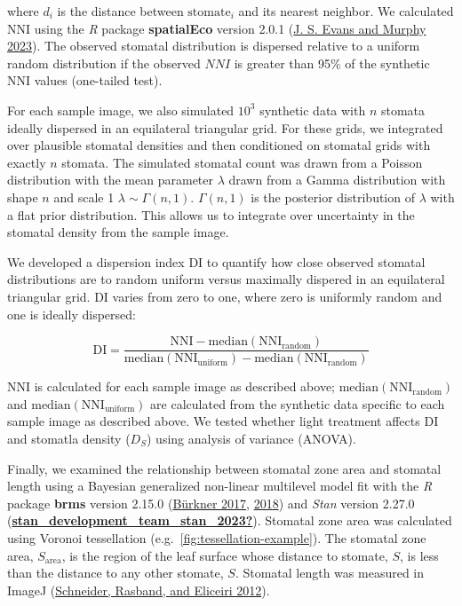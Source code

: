 \documentclass[12pt,halfline,a4paper,]{ouparticle}
\begin{document}
\noindent where \(d_i\) is the distance between \(\text{stomate}_i\) and
its nearest neighbor. We calculated \(\mathrm{NNI}\) using the \emph{R}
package \textbf{spatialEco} version 2.0.1
(\protect\hyperlink{ref-evans_spatialeco_2023}{J. S. Evans and Murphy
2023}). The observed stomatal distribution is dispersed relative to a
uniform random distribution if the observed \(NNI\) is greater than 95\%
of the synthetic \(\mathrm{NNI}\) values (one-tailed test).

For each sample image, we also simulated \(10^3\) synthetic data with
\(n\) stomata ideally dispersed in an equilateral triangular grid. For
these grids, we integrated over plausible stomatal densities and then
conditioned on stomatal grids with exactly \(n\) stomata. The simulated
stomatal count was drawn from a Poisson distribution with the mean
parameter \(\lambda\) drawn from a Gamma distribution with shape \(n\)
and scale 1 \(\lambda \sim \Gamma(n, 1)\). \(\Gamma(n, 1)\) is the
posterior distribution of \(\lambda\) with a flat prior distribution.
This allows us to integrate over uncertainty in the stomatal density
from the sample image.

We developed a dispersion index \(\mathrm{DI}\) to quantify how close
observed stomatal distributions are to random uniform versus maximally
dispered in an equilateral triangular grid. \(\mathrm{DI}\) varies from
zero to one, where zero is uniformly random and one is ideally
dispersed:

\begin{equation}\label{eq:disp}
  \mathrm{DI} = \frac{\mathrm{NNI} - \text{median}(\mathrm{NNI_{random}})}{\text{median}(\mathrm{NNI_{uniform}}) - \text{median}(\mathrm{NNI_{random}})}
\end{equation}

\noindent \(\mathrm{NNI}\) is calculated for each sample image as
described above; \(\text{median}(\mathrm{NNI_{random}})\) and
\(\text{median}(\mathrm{NNI_{uniform}})\) are calculated from the
synthetic data specific to each sample image as described above. We
tested whether light treatment affects \(\mathrm{DI}\) and stomatla
density (\(D_S\)) using analysis of variance (ANOVA).

Finally, we examined the relationship between stomatal zone area and
stomatal length using a Bayesian generalized non-linear multilevel model
fit with the \emph{R} package \textbf{brms} version 2.15.0
(\protect\hyperlink{ref-burkner_brms_2017}{Bürkner 2017},
\protect\hyperlink{ref-burkner_advanced_2018}{2018}) and \emph{Stan}
version 2.27.0
(\protect\hyperlink{ref-stan_development_team_stan_2023}{\textbf{stan\_development\_team\_stan\_2023?}}).
Stomatal zone area was calculated using Voronoi tessellation
(e.g.~\autoref{fig:tessellation-example}). The stomatal zone area,
\(S_\text{area}\), is the region of the leaf surface whose distance to
stomate, \(S\), is less than the distance to any other stomate, \(S\).
Stomatal length was measured in ImageJ
(\protect\hyperlink{ref-schneider_nih_2012}{Schneider, Rasband, and
Eliceiri 2012}).
\end{document}
